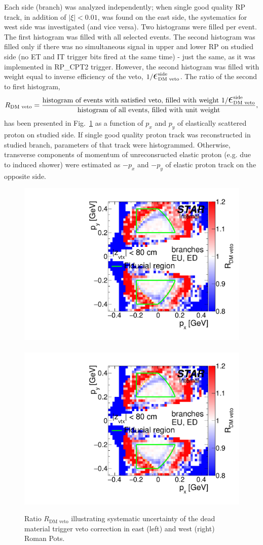 Each side (branch) was analyzed independently; when single good quality RP track, in addition of $|\xi|<0.01$, was found on the east side, the systematics for west side was investigated (and vice versa). Two histograms were filled per event. The first histogram was filled with all selected events. The second histogram was filled only if there was no simultaneous signal in upper and lower RP on studied side (no ET and IT trigger bits fired at the same time) - just the same, as it was implemented in RP\_CPT2 trigger. However, the second histogram was filled with weight equal to inverse efficiency of the veto, $1/\mbox{\LARGE$\epsilon$}_{\text{DM~veto}}^{\text{side}}$. The ratio of the second to first histogram,
\begin{equation}
 R_{\text{DM~veto}} = \frac{\text{histogram of events with satisfied veto, filled with weight } 1/\mbox{\LARGE$\epsilon$}_{\text{DM~veto}}^{\text{side}}}{\text{histogram of all events, filled with unit weight}},
\end{equation}
has been presented in Fig.~\ref{fig:systDMveto} as a function of $p_{x}$ and $p_{y}$ of elastically scattered proton on studied side. If single good quality proton track was reconstructed in studied branch, parameters of that track were histogrammed. Otherwise, transverse components of momentum of unreconsructed elastic proton (e.g. due to induced shower) were estimated as $-p_{x}$ and $-p_{y}$ of elastic proton track on the opposite side.

\begin{figure}[h]
\centering
\includegraphics[width=.48\textwidth,page=1]{graphics/systematics/deadMatSyst.pdf}~~~~%
\includegraphics[width=.48\textwidth,page=2]{graphics/systematics/deadMatSyst.pdf}%
\caption[Estimated systematic uncertainty related to trigger veto induced by interaction with dead material.]{Ratio $R_{\text{DM~veto}}$ illustrating systematic uncertainty of the dead material trigger veto correction in east (left) and west (right) Roman Pots.}
\label{fig:systDMveto}
\end{figure}

